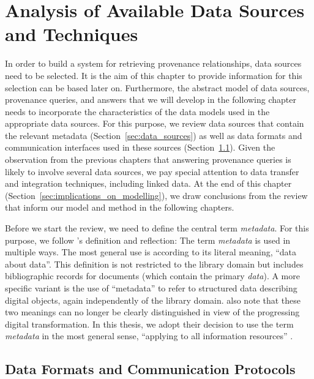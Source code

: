 \chapter{Analysis of Available Data Sources and Techniques}
\label{chap:analysis}

In order to build a system for retrieving provenance relationships,
data sources need to be selected. It is the aim of this chapter
to provide information for this selection can be based later on.
Furthermore, the abstract model of data sources, provenance queries, and answers
that we will develop in the following chapter
needs to incorporate the characteristics of the data models used in the appropriate data sources.
For this purpose, we review data sources that contain the relevant metadata (Section~\ref{sec:data_sources})
as well as data formats and communication interfaces used in these sources (Section~\ref{sec:data_models}).
Given the observation from the previous chapters
that answering provenance queries is likely to involve several data sources,
we pay special attention to data transfer and integration techniques,
including linked data.
At the end of this chapter (Section~\ref{sec:implications_on_modelling}),
we draw conclusions from the review that inform our model and method in the following chapters.

Before we start the review, we need to define the central term \emph{metadata}.
For this purpose, we follow \citeauthor{Hider2008}'s \autocite*{Hider2008} definition and reflection:
The term \emph{metadata} is used in multiple ways.
The most general use is according to its literal meaning, \enquote{data about data}.
This definition is not restricted to the library domain
but includes bibliographic records for documents (which contain the primary \emph{data}).
A more specific variant is the use of \enquote{metadata} to refer to
structured data describing digital objects,
again independently of the library domain. \citeauthor{Hider2008} also note that
these two meanings can no longer be clearly distinguished in view of the
progressing digital transformation. In this thesis, we adopt their
decision to use the term \emph{metadata} in the most general sense,
\enquote{applying to all information resources} \autocite[p.13]{Hider2008}.

\section{Data Formats and Communication Protocols}
\label{sec:data_models}

